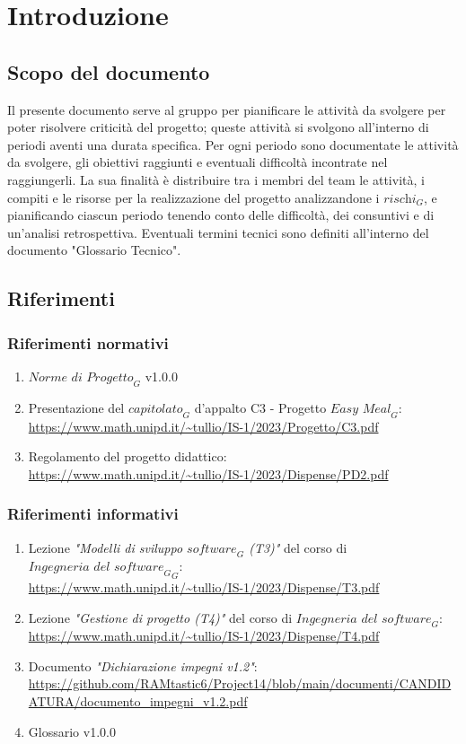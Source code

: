 \section{Introduzione}
\subsection{Scopo del documento}
Il presente documento serve al gruppo per pianificare le attività da svolgere per poter risolvere criticità del progetto; queste attività si svolgono all'interno di periodi aventi una durata specifica.
Per ogni periodo sono documentate le attività da svolgere, gli obiettivi raggiunti e eventuali difficoltà incontrate nel raggiungerli. La sua finalità è distribuire tra i membri del team le attività, i compiti e le risorse per la realizzazione del progetto analizzandone i $\textit{rischi}_G$, e pianificando ciascun periodo tenendo conto delle difficoltà, dei consuntivi e di un'analisi retrospettiva. Eventuali termini tecnici sono definiti all'interno del documento "Glossario Tecnico".
\subsection{Riferimenti}
\subsubsection{Riferimenti normativi}
\begin{enumerate}
    \item $\textit{Norme di Progetto}_G$ v1.0.0
    \item Presentazione del $\textit{capitolato}_G$ d'appalto C3 - Progetto $\textit{Easy Meal}_G$: \\ \url{https://www.math.unipd.it/~tullio/IS-1/2023/Progetto/C3.pdf}
    \item Regolamento del progetto didattico: \\ 
    \url{https://www.math.unipd.it/~tullio/IS-1/2023/Dispense/PD2.pdf}
\end{enumerate}
\subsubsection{Riferimenti informativi}
\label{sec:rif_inf}
\begin{enumerate}
    \item Lezione \emph{"Modelli di sviluppo $\textit{software}_G$ (T3)"} del corso di $\textit{Ingegneria del $\textit{software}_G$}_G$: \\
    \url{https://www.math.unipd.it/~tullio/IS-1/2023/Dispense/T3.pdf}
    \item Lezione \emph{"Gestione di progetto (T4)"} del corso di $\textit{Ingegneria del software}_G$: \\
    \url{https://www.math.unipd.it/~tullio/IS-1/2023/Dispense/T4.pdf}
    \item Documento \emph{"Dichiarazione impegni v1.2"}: \\
    \url{https://github.com/RAMtastic6/Project14/blob/main/documenti/CANDIDATURA/documento_impegni_v1.2.pdf}
    \item Glossario v1.0.0
    
\end{enumerate}

